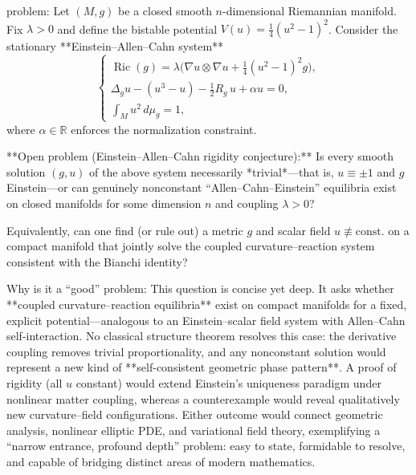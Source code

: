 problem:  
Let \((M,g)\) be a closed smooth \(n\)-dimensional Riemannian manifold.  
Fix \(\lambda>0\) and define the bistable potential \(V(u)=\tfrac14(u^2-1)^2\).  
Consider the stationary **Einstein–Allen–Cahn system**
\[
\begin{cases}
\operatorname{Ric}(g)=\lambda\big(\nabla u\otimes\nabla u+\tfrac14(u^2-1)^2 g\big),\\[0.3em]
\Delta_g u-(u^3-u)-\tfrac12R_g\,u+\alpha u=0,\\[0.3em]
\int_Mu^2\,d\mu_g=1,
\end{cases}
\]
where \(\alpha\in\mathbb{R}\) enforces the normalization constraint.

**Open problem (Einstein–Allen–Cahn rigidity conjecture):**  
Is every smooth solution \((g,u)\) of the above system necessarily *trivial*—that is, \(u\equiv\pm1\) and \(g\) Einstein—or can genuinely nonconstant “Allen–Cahn–Einstein” equilibria exist on closed manifolds for some dimension \(n\) and coupling \(\lambda>0\)?  

Equivalently, can one find (or rule out) a metric \(g\) and scalar field \(u\not\equiv\text{const.}\) on a compact manifold that jointly solve the coupled curvature–reaction system consistent with the Bianchi identity?

Why is it a “good” problem:  
This question is concise yet deep. It asks whether **coupled curvature–reaction equilibria** exist on compact manifolds for a fixed, explicit potential—analogous to an Einstein–scalar field system with Allen–Cahn self-interaction.  
No classical structure theorem resolves this case: the derivative coupling removes trivial proportionality, and any nonconstant solution would represent a new kind of **self-consistent geometric phase pattern**.  A proof of rigidity (all \(u\) constant) would extend Einstein’s uniqueness paradigm under nonlinear matter coupling, whereas a counterexample would reveal qualitatively new curvature–field configurations.  
Either outcome would connect geometric analysis, nonlinear elliptic PDE, and variational field theory, exemplifying a “narrow entrance, profound depth” problem: easy to state, formidable to resolve, and capable of bridging distinct areas of modern mathematics.